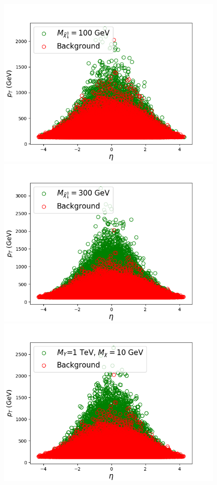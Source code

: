 \documentclass[prd,aps,letterpaper,floatfix,superscriptaddress,preprintnumbers,twocolumn,10pt,nofootinbib]{revtex4-1}
\begin{document}
\begin{figure} [t!]
\centering
\includegraphics[scale=0.32]{figures/ptjetajsmsusy1.png}
\includegraphics[scale=0.32]{figures/ptjetajsmsusy3.png}
\includegraphics[scale=0.32]{figures/ptjetajsmeft.png}\\

\end{figure}
\end{document}
